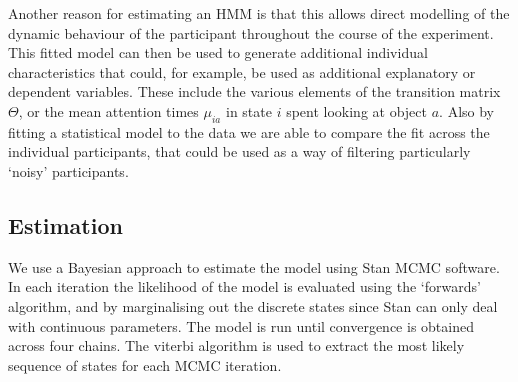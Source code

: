 \documentclass[9pt]{article}
\begin{document}
Another reason for estimating an HMM is that this allows direct modelling of the dynamic behaviour of the participant throughout the course of the experiment. This fitted model can then be used to generate additional individual characteristics that could, for example, be used as additional explanatory or dependent variables. These include the various elements of the transition matrix $\Theta$, or the mean attention times $\mu_{ia}$ in state $i$ spent looking at object $a$. Also by fitting a statistical model to the data we are able to compare the fit across the individual participants, that could be used as a way of filtering particularly `noisy' participants.

\subsection{Estimation}
We use a Bayesian approach to estimate the model using Stan MCMC software. In each iteration the likelihood of the model is evaluated using the `forwards' algorithm, and by marginalising out the discrete states since Stan can only deal with continuous parameters. The model is run until convergence is obtained across four chains. The viterbi algorithm is used to extract the most likely sequence of states for each MCMC iteration.
\end{document}
